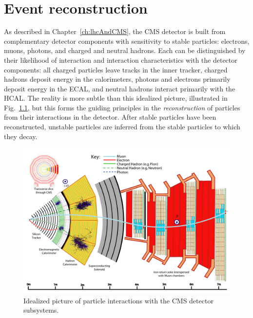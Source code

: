\chapter{Event reconstruction}
\label{ch:reconstruction}

As described in Chapter~\ref{ch:lhcAndCMS}, the CMS detector
is built from complementary detector components with sensitivity
to stable particles: electrons, muons, photons, and charged
and neutral hadrons. Each can be distinguished by their likelihood of interaction
and interaction characteristics with the detector components:
all charged particles leave tracks in the inner tracker,
charged hadrons deposit energy in the calorimeters, photons
and electrons primarily deposit energy in the ECAL, and neutral
hadrons interact primarily with the HCAL.
The reality is more subtle than this idealized picture, illustrated
in Fig.~\ref{fig:particleFlow}, but this forms the guiding principles
in the \emph{reconstruction} of particles from their interactions in the detector.
After stable particles have been reconstructed, 
unstable particles are inferred from the stable particles to 
which they decay.

\begin{figure}[htbp]
  \centering
   \includegraphics[width=\textwidth]{figures/Reconstruction/CMSDetectorParticleFlow.pdf}
  \caption{
    Idealized picture of particle interactions with the CMS detector subsystems.
        }
 \label{fig:particleFlow}
\end{figure}

